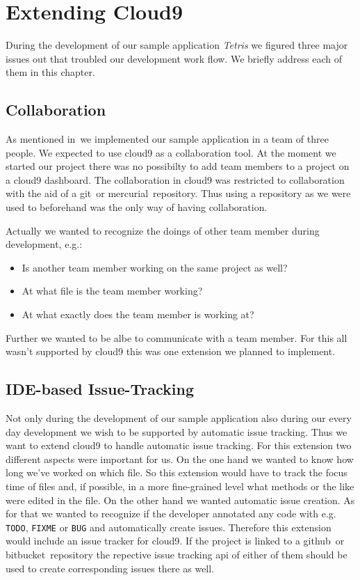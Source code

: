 \section{Extending Cloud9}
\label{sec:Approaches}
During the development of our sample application \emph{Tetris} we figured three major issues out that troubled our development work flow.
We briefly address each of them in this chapter.

\subsection{Collaboration}
As mentioned in~ we implemented our sample application in a team of three people.
We expected to use cloud9 as a collaboration tool.
At the moment we started our project there was no possibilty to add team members to a project on a cloud9 dashboard.
The collaboration in cloud9 was restricted to collaboration with the aid of a git~\needcite or mercurial~\needcite repository.
Thus using a repository as we were used to beforehand was the only way of having collaboration.

Actually we wanted to recognize the doings of other team member during development, e.g.:
\begin{itemize}
	\item Is another team member working on the same project as well?
	\item At what file is the team member working?
	\item At what exactly does the team member is working at?
\end{itemize}
Further we wanted to be albe to communicate with a team member.
For this all wasn't supported by cloud9 this was one extension we planned to implement.

\subsection{IDE-based Issue-Tracking}
Not only during the development of our sample application also during our every day development we wish to be supported by automatic issue tracking.
Thus we want to extend cloud9 to handle automatic issue tracking.
For this extension two different aspects were important for us.
On the one hand we wanted to know how long we've worked on which file.
So this extension would have to track the focus time of files and, if possible, in a more fine-grained level what methods or the like were edited in the file.
On the other hand we wanted automatic issue creation.
As for that we wanted to recognize if the developer annotated any code with e.g. \texttt{TODO}, \texttt{FIXME} or \texttt{BUG} and automatically create issues.
Therefore this extension would include an issue tracker for cloud9.
If the project is linked to a github~\needcite or bitbucket~\needcite repository the repective issue tracking api of either of them should be used to create corresponding issues there as well.

